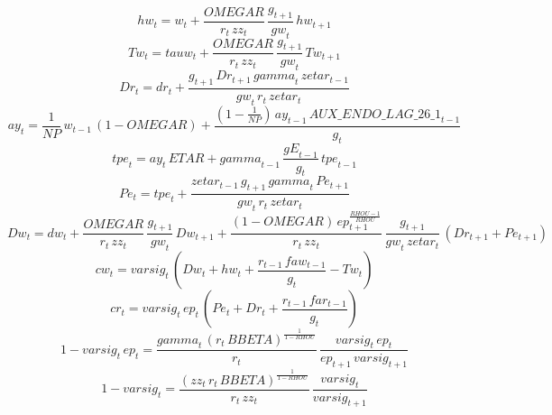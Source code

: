 \begin{dmath}
{hw}_{t}={w}_{t}+\frac{{OMEGAR}}{{r}_{t}\, {zz}_{t}}\, \frac{{g}_{t+1}}{{gw}_{t}}\, {hw}_{t+1}
\end{dmath}
\begin{dmath}
{Tw}_{t}={tauw}_{t}+\frac{{OMEGAR}}{{r}_{t}\, {zz}_{t}}\, \frac{{g}_{t+1}}{{gw}_{t}}\, {Tw}_{t+1}
\end{dmath}
\begin{dmath}
{Dr}_{t}={dr}_{t}+\frac{{g}_{t+1}\, {Dr}_{t+1}\, {gamma}_{t}\, {zetar}_{t-1}}{{gw}_{t}\, {r}_{t}\, {zetar}_{t}}
\end{dmath}
\begin{dmath}
{ay}_{t}=\frac{1}{{NP}}\, {w}_{t-1}\, \left(1-{OMEGAR}\right)+\frac{\left(1-\frac{1}{{NP}}\right)\, {ay}_{t-1}\, {AUX\_ENDO\_LAG\_26\_1}_{t-1}}{{g}_{t}}
\end{dmath}
\begin{dmath}
{tpe}_{t}={ay}_{t}\, {ETAR}+{gamma}_{t-1}\, \frac{{gE}_{t-1}}{{g}_{t}}\, {tpe}_{t-1}
\end{dmath}
\begin{dmath}
{Pe}_{t}={tpe}_{t}+\frac{{zetar}_{t-1}\, {g}_{t+1}\, {gamma}_{t}\, {Pe}_{t+1}}{{gw}_{t}\, {r}_{t}\, {zetar}_{t}}
\end{dmath}
\begin{dmath}
{Dw}_{t}={dw}_{t}+\frac{{OMEGAR}}{{r}_{t}\, {zz}_{t}}\, \frac{{g}_{t+1}}{{gw}_{t}}\, {Dw}_{t+1}+\frac{\left(1-{OMEGAR}\right)\, {ep}_{t+1}^{\frac{{RHOU}-1}{{RHOU}}}}{{r}_{t}\, {zz}_{t}}\, \frac{{g}_{t+1}}{{gw}_{t}\, {zetar}_{t}}\, \left({Dr}_{t+1}+{Pe}_{t+1}\right)
\end{dmath}
\begin{dmath}
{cw}_{t}={varsig}_{t}\, \left({Dw}_{t}+{hw}_{t}+\frac{{r}_{t-1}\, {faw}_{t-1}}{{g}_{t}}-{Tw}_{t}\right)
\end{dmath}
\begin{dmath}
{cr}_{t}={varsig}_{t}\, {ep}_{t}\, \left({Pe}_{t}+{Dr}_{t}+\frac{{r}_{t-1}\, {far}_{t-1}}{{g}_{t}}\right)
\end{dmath}
\begin{dmath}
1-{varsig}_{t}\, {ep}_{t}=\frac{{gamma}_{t}\, \left({r}_{t}\, {BBETA}\right)^{\frac{1}{1-{RHOU}}}}{{r}_{t}}\, \frac{{varsig}_{t}\, {ep}_{t}}{{ep}_{t+1}\, {varsig}_{t+1}}
\end{dmath}
\begin{dmath}
1-{varsig}_{t}=\frac{\left({zz}_{t}\, {r}_{t}\, {BBETA}\right)^{\frac{1}{1-{RHOU}}}}{{r}_{t}\, {zz}_{t}}\, \frac{{varsig}_{t}}{{varsig}_{t+1}}
\end{dmath}

